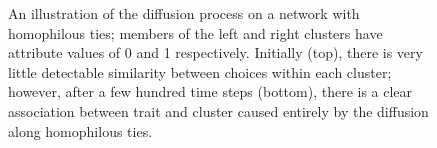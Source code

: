 \documentclass{article}
\begin{document}
\begin{multicols}{2}
\begin{figure}
  \begin{center}
  \end{center}
  \caption{An illustration of the diffusion process on a network with
    homophilous ties; members of the left and right clusters have attribute
    values of 0 and 1 respectively. Initially (top), there is very little
    detectable similarity between choices within each cluster; however, after a
    few hundred time steps (bottom), there is a clear association between trait
    and cluster caused entirely by the diffusion along homophilous ties.}
\label{fig:network-evolutions}
\end{figure}



\end{multicols}
\end{document}
